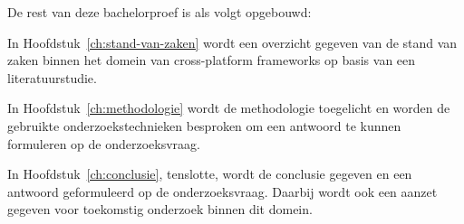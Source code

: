 
De rest van deze bachelorproef is als volgt opgebouwd:

In Hoofdstuk~\ref{ch:stand-van-zaken} wordt een overzicht gegeven van de stand
van zaken binnen het domein van cross-platform frameworks op basis van een literatuurstudie.

In Hoofdstuk~\ref{ch:methodologie} wordt de methodologie toegelicht en worden de
gebruikte onderzoekstechnieken besproken om een antwoord te kunnen formuleren op
de onderzoeksvraag.


In Hoofdstuk~\ref{ch:conclusie}, tenslotte, wordt de conclusie gegeven en een
antwoord geformuleerd op de onderzoeksvraag. Daarbij wordt ook een aanzet
gegeven voor toekomstig onderzoek binnen dit domein.



